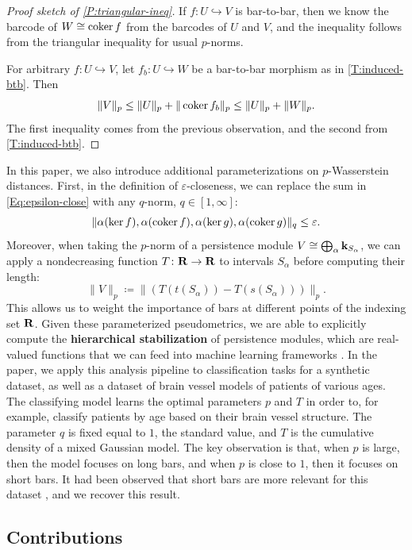 \begin{proof}[Proof sketch of \cref{P:triangular-ineq}]
  If $f \colon U \hookrightarrow V$ is bar-to-bar, then we know the barcode of $W \cong \operatorname{coker} f$ from the barcodes of $U$ and $V$, and the inequality follows from the triangular inequality for usual $p$-norms.
  
  For arbitrary $f \colon U \hookrightarrow V$, let $f_b \colon U \hookrightarrow W$ be a bar-to-bar morphism as in \cref{T:induced-btb}. Then
  \[
    \| V \|_p \leq \| U \|_p + \| \operatorname{coker} f_b \|_p \leq \| U \|_p + \| W \|_p.
  \]
  The first inequality comes from the previous observation, and the second from \cref{T:induced-btb}.
\end{proof}

In this paper, we also introduce additional parameterizations on $p$-Wasserstein distances. First, in the definition of $\varepsilon$-closeness, we can replace the sum in \eqref{Eq:epsilon-close} with any $q$-norm, $q \in [1, \infty]$:
\[
  \| \alpha(\ker f), \alpha(\operatorname{coker} f), \alpha(\ker g), \alpha(\operatorname{coker} g) \|_q \leq \varepsilon.
\]
Moreover, when taking the $p$-norm of a persistence module $V \cong \bigoplus_\alpha \mathbf{k}_{S_\alpha}$, we can apply a nondecreasing function $T \colon \mathbf{R} \to \mathbf{R}$ to intervals $S_\alpha$ before computing their length:
\[
  \| V \|_p \coloneq \| (T(t(S_\alpha)) - T(s(S_\alpha))) \|_p.
\]
This allows us to weight the importance of bars at different points of the indexing set $\mathbf{R}$. Given these parameterized pseudometrics, we are able to explicitly compute the \textbf{hierarchical stabilization} of persistence modules, which are real-valued functions that we can feed into machine learning frameworks \cite{GafvertChacholski2021,SCLRÖ2017}. In the paper, we apply this analysis pipeline to classification tasks for a synthetic dataset, as well as a dataset of brain vessel models of patients of various ages. The classifying model learns the optimal parameters $p$ and $T$ in order to, for example, classify patients by age based on their brain vessel structure. The parameter $q$ is fixed equal to $1$, the standard value, and $T$ is the cumulative density of a mixed Gaussian model. The key observation is that, when $p$ is large, then the model focuses on long bars, and when $p$ is close to $1$, then it focuses on short bars. It had been observed that short bars are more relevant for this dataset \cite{BMMPS2016}, and we recover this result.

\subsection*{Contributions}

